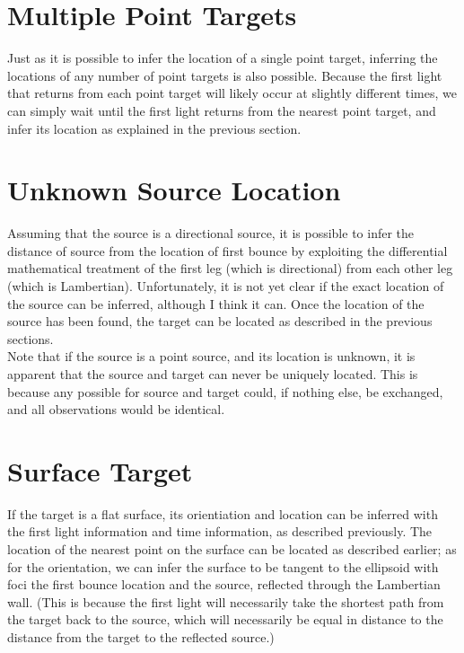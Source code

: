 \documentclass[11pt]{article}
\begin{document}
\section{Multiple Point Targets}

Just as it is possible to infer the location of a single point target, inferring the locations of any number of point targets is also possible. Because the first light that returns from each point target will likely occur at slightly different times, we can simply wait until the first light returns from the nearest point target, and infer its location as explained in the previous section. 

\section{Unknown Source Location}

Assuming that the source is a directional source, it is possible to infer the distance of source from the location of first bounce by exploiting the differential mathematical treatment of the first leg (which is directional) from each other leg (which is Lambertian). Unfortunately, it is not yet clear if the exact location of the source can be inferred, although I think it can. Once the location of the source has been found, the target can be located as described in the previous sections. \\

Note that if the source is a point source, and its location is unknown, it is apparent that the source and target can never be uniquely located. This is because any possible for source and target could, if nothing else, be exchanged, and all observations would be identical.

\section{Surface Target}

If the target is a flat surface, its orientiation and location can be inferred with the first light information and time information, as described previously. The location of the nearest point on the surface can be located as described earlier; as for the orientation, we can infer the surface to be tangent to the ellipsoid with foci the first bounce location and the source, reflected through the Lambertian wall. (This is because the first light will necessarily take the shortest path from the target back to the source, which will necessarily be equal in distance to the distance from the target to the reflected source.)
\end{document}

